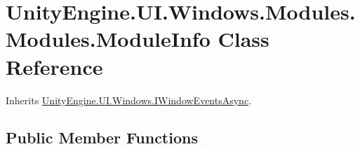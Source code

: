 \hypertarget{class_unity_engine_1_1_u_i_1_1_windows_1_1_modules_1_1_modules_1_1_module_info}{}\section{Unity\+Engine.\+U\+I.\+Windows.\+Modules.\+Modules.\+Module\+Info Class Reference}
\label{class_unity_engine_1_1_u_i_1_1_windows_1_1_modules_1_1_modules_1_1_module_info}


Inherits \hyperlink{interface_unity_engine_1_1_u_i_1_1_windows_1_1_i_window_events_async}{Unity\+Engine.\+U\+I.\+Windows.\+I\+Window\+Events\+Async}.

\subsection*{Public Member Functions}
